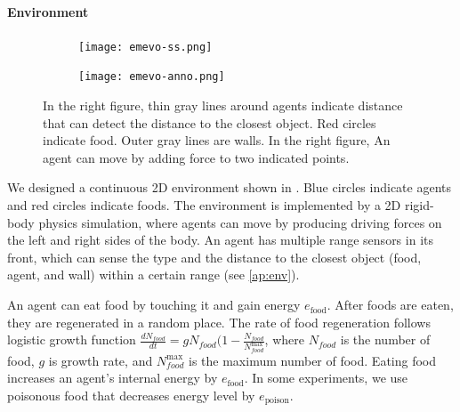 \paragraph{Environment}

\begin{figure}[t]
  \begin{subfigure}[t]{6cm}
    \centering
    \texttt{[image: emevo-ss.png]}
  \end{subfigure}
  \begin{subfigure}[t]{8cm}
    \centering
    \texttt{[image: emevo-anno.png]}
  \end{subfigure}
  \caption{
    In the right figure, thin gray lines around agents indicate distance that can detect the distance to the closest object. Red circles indicate food. Outer gray lines are walls.
    In the right figure, An agent can move by adding force to two indicated points.
  }\label{figure:env}
\end{figure}

We designed a continuous 2D environment shown in . Blue circles indicate agents and red circles indicate foods. The environment is implemented by a 2D rigid-body physics simulation, where agents can move by 
producing driving forces on the left and right sides of the body.
An agent has multiple range sensors in its front, which can sense the type and the distance to the closest object (food, agent, and wall) within a certain range 
(see \cref{ap:env}).

An agent can eat food by touching it and gain energy $e_{\mathrm{food}}$. After foods are eaten, they are regenerated in a random place.
The rate of food regeneration follows logistic growth function $\frac{dN_{food}}{dt} = g N_{food} (1 - \frac{N_{food}}{N_{food}^{\mathrm{max}}}$, where $N_{food}$ is the number of food, $g$ is growth rate, and $N_{food}^{\mathrm{max}}$ is the maximum number of food. 
Eating food increases an agent's internal energy by $e_{\mathrm{food}}$. In some experiments, we use poisonous food that decreases energy level by $e_{\mathrm{poison}}$.


